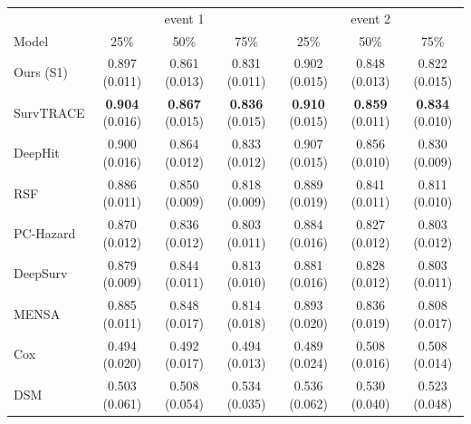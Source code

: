 \begin{tabular}{lcccccc}
\toprule
 & \multicolumn{3}{c}{event 1} & \multicolumn{3}{c}{event 2} \\
Model & 25\% & 50\% & 75\% & 25\% & 50\% & 75\% \\
\midrule
Ours (S1) & 0.897 (0.011) & 0.861 (0.013) & 0.831 (0.011) & 0.902 (0.015) & 0.848 (0.013) & 0.822 (0.015) \\
SurvTRACE & \textbf{0.904} (0.016) & \textbf{0.867} (0.015) & \textbf{0.836} (0.015) & \textbf{0.910} (0.015) & \textbf{0.859} (0.011) & \textbf{0.834} (0.010) \\
DeepHit & 0.900 (0.016) & 0.864 (0.012) & 0.833 (0.012) & 0.907 (0.015) & 0.856 (0.010) & 0.830 (0.009) \\
RSF & 0.886 (0.011) & 0.850 (0.009) & 0.818 (0.009) & 0.889 (0.019) & 0.841 (0.011) & 0.811 (0.010) \\
PC-Hazard & 0.870 (0.012) & 0.836 (0.012) & 0.803 (0.011) & 0.884 (0.016) & 0.827 (0.012) & 0.803 (0.012) \\
DeepSurv & 0.879 (0.009) & 0.844 (0.011) & 0.813 (0.010) & 0.881 (0.016) & 0.828 (0.012) & 0.803 (0.011) \\
MENSA & 0.885 (0.011) & 0.848 (0.017) & 0.814 (0.018) & 0.893 (0.020) & 0.836 (0.019) & 0.808 (0.017) \\
Cox & 0.494 (0.020) & 0.492 (0.017) & 0.494 (0.013) & 0.489 (0.024) & 0.508 (0.016) & 0.508 (0.014) \\
DSM & 0.503 (0.061) & 0.508 (0.054) & 0.534 (0.035) & 0.536 (0.062) & 0.530 (0.040) & 0.523 (0.048) \\
\bottomrule
\end{tabular}
